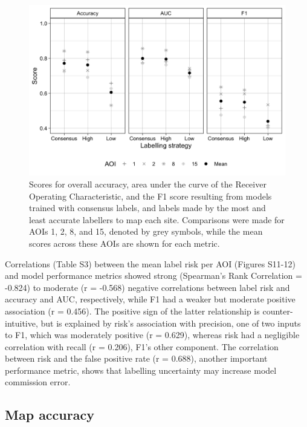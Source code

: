 \documentclass[11pt,a4paper]{article}
\begin{document}
\begin{figure}

{\centering \includegraphics[width=1\linewidth]{figures/figure5} 

}

\caption{Scores for overall accuracy, area under the curve of the Receiver Operating Characteristic, and the F1 score resulting from models trained with consensus labels, and labels made by the most and least accurate labellers to map each site. Comparisons were made for AOIs 1, 2, 8, and 15, denoted by grey symbols, while the mean scores across these AOIs are shown for each metric.}\label{fig:trainingimpact}
\end{figure}

Correlations (Table S3) between the mean label risk per AOI (Figures
S11-12) and model performance metrics showed strong (Spearman's Rank
Correlation = -0.824) to moderate (r = -0.568) negative correlations
between label risk and accuracy and AUC, respectively, while F1 had a
weaker but moderate positive association (r = 0.456). The positive sign
of the latter relationship is counter-intuitive, but is explained by
risk's association with precision, one of two inputs to F1, which was
moderately positive (r = 0.629), whereas risk had a negligible
correlation with recall (r = 0.206), F1's other component. The
correlation between risk and the false positive rate (r = 0.688),
another important performance metric, shows that labelling uncertainty
may increase model commission error.

\hypertarget{map-accuracy}{%
\subsection{Map accuracy}\label{map-accuracy}}
\end{document}
